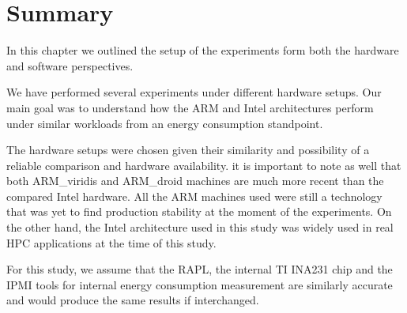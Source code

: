 \clearpage 

\section{Summary}
In this chapter we outlined the setup of the experiments form both the hardware and software perspectives.

We have performed several experiments under different hardware setups. 
Our main goal was to understand how the ARM and Intel architectures
perform under similar workloads from an energy consumption standpoint.

The hardware setups were chosen given their similarity and possibility of a reliable comparison and hardware availability. it is important to note as
well that both ARM\_viridis and ARM\_droid machines are much more recent than the compared Intel
hardware. All the ARM machines used were still a technology that was yet to find production
stability at the moment of the experiments. On the other hand, the Intel architecture used in this study was widely used in real HPC applications at the time of this study.

For this study, we assume that the RAPL, the internal TI INA231 chip and the IPMI tools for internal energy
consumption measurement are similarly accurate and would produce the same results if interchanged. 

